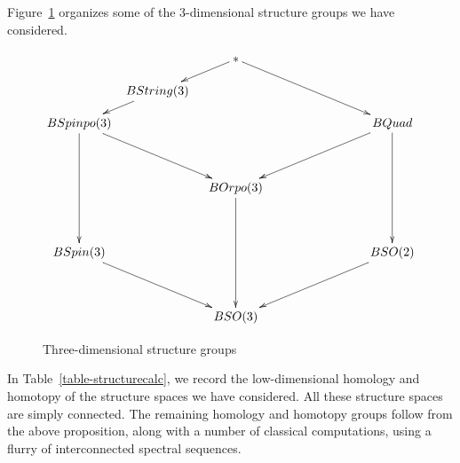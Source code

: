 \documentclass{amsart}
\begin{document}
Figure~\ref{fig-structuregroups} organizes some of the 3-dimensional structure groups we have considered.
\begin{figure}[!ht]
\begin{equation} \nn
\xymatrix@!R@!C@R=10pt@C=5pt{
&& \ast \ar[dl] \ar[ddrr] && \\
& BString(3) \ar[dl] &&& \\
BSpinpo(3) \ar[ddrr] \ar[dddd] &&&& BQuad \ar[ddll] \ar[dddd] \\
&&&& \\
&& BOrpo(3) \ar[dddd] && \\
&&&& \\
BSpin(3) \ar[ddrr] &&&& BSO(2) \ar[ddll] \\
&&&& \\
&& BSO(3) &&
}
\end{equation}
\caption{Three-dimensional structure groups} \label{fig-structuregroups}
\end{figure}

In Table~\ref{table-structurecalc}, we record the low-dimensional homology and homotopy of the structure spaces we have considered.  All these structure spaces are simply connected.  The remaining homology and homotopy groups follow from the above proposition, along with a number of classical computations, using a flurry of interconnected spectral sequences.  
\end{document}
